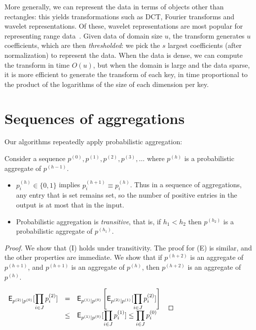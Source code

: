 \documentclass[11pt]{article}
\begin{document}
More generally, we can represent the data in terms of objects other
than rectangles: this yields transformations such as 
DCT, Fourier transforms and wavelet representations. 
Of these, wavelet representations are most popular for representing
range data~\cite{Matias98wavelet-basedhistograms,Vitter98datacube}.
Given data of domain size $u$, the transform generates $u$
coefficients, which are then {\em thresholded}: we pick the $s$
largest coefficients (after normalization) to represent the data. 
When the data is dense, we can compute the transform in time $O(u)$,
but when the domain is large and the data sparse, it is more efficient
to generate the transform of each key, in time proportional to the
product of the logarithms of the size of each dimension per key. 



\section{Sequences of aggregations}
\label{probaggapp}
\noindent
Our algorithms repeatedly apply probabilistic aggregation:

\begin{lemma}\label{lemma:a}
 Consider a sequence $p^{(0)},p^{(1)},p^{(2)},p^{(3)},\ldots$ where
$p^{(h)}$ is a probabilistic aggregate of $p^{(h-1)}$.
\begin{itemize}
\item
$p^{(h)}_i\in \{0,1\}$ implies $p^{(h+1)}_i\equiv p^{(h)}_i$.  
Thus in a sequence of aggregations, 
any entry that is set remains set, so
the number of positive entries in the output is
at most that in the input.
\item
Probabilistic aggregation is {\em transitive}, that is, if $h_1<h_2$ then
$p^{(h_2)}$ is a probabilistic aggregate of $p^{(h_1)}$.
\end{itemize}
\end{lemma}

\begin{proof}
We show that (I) holds under transitivity.  The proof for (E) is
similar, and the other properties are immediate.
We show that if $p^{(h+2)}$ is an aggregate of $p^{(h+1)}$, and 
$p^{(h+1)}$ is an aggregate of $p^{(h)}$, then
$p^{(h+2)}$ is an aggregate of $p^{(h)}$.


$\begin{array}{rcl}
\displaystyle
\textsf{E}_{p^{(2)}|p^{(0)}}[\prod_{i\in J} p^{(2)}_i] & = & 
\displaystyle
\textsf{E}_{p^{(1)}|p^{(0)}}\left[ \textsf{E}_{p^{(2)}|p^{(1)}} [\prod_{i\in J} p^{(2)}_i]\right] \\
& \leq & 
\displaystyle
\textsf{E}_{p^{(1)}|p^{(0)}} [\prod_{i\in J} p^{(1)}_i] \leq \prod_{i\in J} p^{(0)}_i
\end{array}$
\end{proof}
\end{document}
